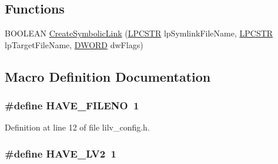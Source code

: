 \subsection*{Functions}
\begin{DoxyCompactItemize}
\item 
B\+O\+O\+L\+E\+AN \hyperlink{lib-src_2lv2_2windows_2lilv__config_8h_ad63a5e98acf033ea8828de8ff511dce9}{Create\+Symbolic\+Link} (\hyperlink{mapinls_8h_a866fd74f5159bb4d319261005a5e85e0}{L\+P\+C\+S\+TR} lp\+Symlink\+File\+Name, \hyperlink{mapinls_8h_a866fd74f5159bb4d319261005a5e85e0}{L\+P\+C\+S\+TR} lp\+Target\+File\+Name, \hyperlink{mapinls_8h_ad342ac907eb044443153a22f964bf0af}{D\+W\+O\+RD} dw\+Flags)
\end{DoxyCompactItemize}


\subsection{Macro Definition Documentation}
\subsubsection[{\texorpdfstring{H\+A\+V\+E\+\_\+\+F\+I\+L\+E\+NO}{HAVE_FILENO}}]{\setlength{\rightskip}{0pt plus 5cm}\#define H\+A\+V\+E\+\_\+\+F\+I\+L\+E\+NO~1}\hypertarget{lib-src_2lv2_2windows_2lilv__config_8h_acbc37357ec546ab973057c6a8fa96a67}{}\label{lib-src_2lv2_2windows_2lilv__config_8h_acbc37357ec546ab973057c6a8fa96a67}


Definition at line 12 of file lilv\+\_\+config.\+h.

\subsubsection[{\texorpdfstring{H\+A\+V\+E\+\_\+\+L\+V2}{HAVE_LV2}}]{\setlength{\rightskip}{0pt plus 5cm}\#define H\+A\+V\+E\+\_\+\+L\+V2~1}\hypertarget{lib-src_2lv2_2windows_2lilv__config_8h_a3377686d402043f36819f446ef0e0edd}{}\label{lib-src_2lv2_2windows_2lilv__config_8h_a3377686d402043f36819f446ef0e0edd}


